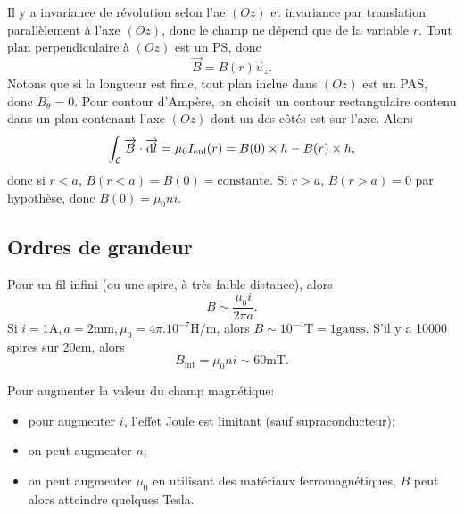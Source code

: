             Il y a invariance de révolution selon l'ae $(Oz)$ et invariance par translation parallèlement à l'axe $(Oz)$, donc le champ ne dépend que de la variable $r$. Tout plan perpendiculaire à $(Oz)$ est un PS, donc 
            \begin{equation*}
                \boxed{
                    \vec{B}=B(r)\vec{u}_z.
                }
            \end{equation*}
            Notons que si la longueur est finie, tout plan inclue dans $(Oz)$ est un PAS, donc $B_{\theta}=0$. Pour contour d'Ampère, on choisit un contour rectangulaire contenu dans un plan contenant l'axe $(Oz)$ dont un des côtés est sur l'axe. Alors
            \begin{equation*}
                \int_{\mathcal{C}}\protect\overrightarrow{{B}}\cdot\protect\overrightarrow{{\mathrm{d} l}}=\mu_{0}I_{\mathrm{enl}}(r)=B(0)\times h - B(r)\times h,
            \end{equation*}
            donc si $r<a$, $B(r<a)=B(0)=\mathrm{constante}$. Si $r>a$, $B(r>a)=0$ par hypothèse, donc $B(0)=\mu_0 n i$.

    \subsection{Ordres de grandeur}

        Pour un fil infini (ou une spire, à très faible distance), alors 
        \begin{equation*}
            B\sim\frac{\mu_0 i}{2\pi a}.
        \end{equation*}
        Si $i=1\si{\ampere},a=2\si{\milli\metre},\mu_0=4\pi.10^{-7}\si{\henry\per\metre}$, alors $B\sim 10^{-4}\si{\tesla}=1\mathrm{gauss}$.
        S'il y a 10000 spires sur 20\si{\centi\metre}, alors 
        \begin{equation*}
            B_{\mathrm{int}}=\mu_0 n i\sim 60\si{\milli\tesla}.
        \end{equation*}

        Pour augmenter la valeur du champ magnétique:
        \begin{itemize}
            \item pour augmenter $i$, l'effet Joule est limitant (sauf supraconducteur);
            \item on peut augmenter $n$;
            \item on peut augmenter $\mu_0$ en utilisant des matériaux ferromagnétiques, $B$ peut alors atteindre quelques Tesla.
        \end{itemize}

